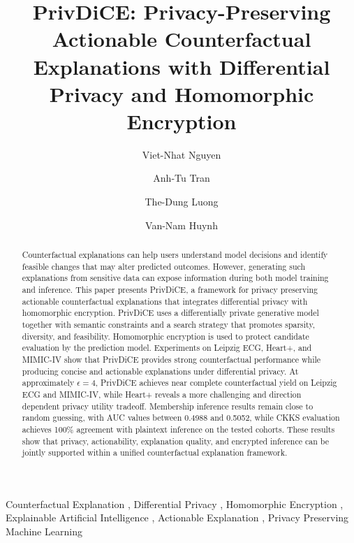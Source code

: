 \documentclass[preprint,12pt]{elsarticle}
\begin{document}
\begin{frontmatter}

\title{PrivDiCE: Privacy-Preserving Actionable Counterfactual Explanations with Differential Privacy and Homomorphic Encryption}

\author[rvt1,rvt3]{Viet-Nhat Nguyen}
\author[rvt2]{Anh-Tu Tran }
\author[rvt1]{The-Dung Luong}
\author[rvt4]{Van-Nam Huynh}



\address[rvt1]{Vietnam Academy of Cryptography Techniques, Hanoi, Vietnam}
\address[rvt2]{Faculty of Mathematics and Informatics, Hanoi University of Science and Technology, Hanoi, Vietnam}
\address[rvt3]{Hanoi University of Civil Engineering, Hanoi, Vietnam}
\address[rvt4]{Graduate School of Advanced Science and Technology, Japan Advanced Institute of Science and Technology, Nomi, Ishikawa, Japan}

\begin{abstract}
Counterfactual explanations can help users understand model decisions and identify feasible changes that may alter predicted outcomes. However, generating such explanations from sensitive data can expose information during both model training and inference. This paper presents PrivDiCE, a framework for privacy preserving actionable counterfactual explanations that integrates differential privacy with homomorphic encryption. PrivDiCE uses a differentially private generative model together with semantic constraints and a search strategy that promotes sparsity, diversity, and feasibility. Homomorphic encryption is used to protect candidate evaluation by the prediction model. Experiments on Leipzig ECG, Heart+, and MIMIC-IV show that PrivDiCE provides strong counterfactual performance while producing concise and actionable explanations under differential privacy. At approximately $\epsilon=4$, PrivDiCE achieves near complete counterfactual yield on Leipzig ECG and MIMIC-IV, while Heart+ reveals a more challenging and direction dependent privacy utility tradeoff. Membership inference results remain close to random guessing, with AUC values between 0.4988 and 0.5052, while CKKS evaluation achieves 100\% agreement with plaintext inference on the tested cohorts. These results show that privacy, actionability, explanation quality, and encrypted inference can be jointly supported within a unified counterfactual explanation framework.
\end{abstract}


\begin{keyword}
Counterfactual Explanation \sep
Differential Privacy \sep
Homomorphic Encryption \sep
Explainable Artificial Intelligence \sep
Actionable Explanation \sep
Privacy Preserving Machine Learning
\end{keyword}

\end{frontmatter}
\end{document}
